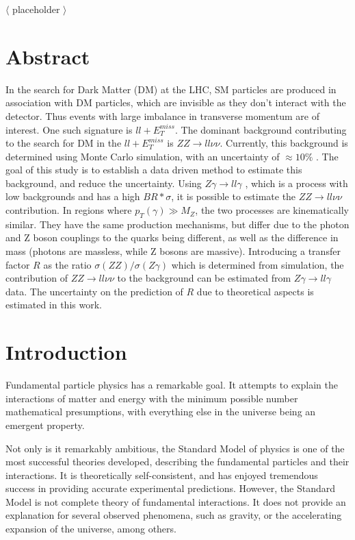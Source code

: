 \documentclass[11pt,a4paper,openright,twoside]{report}
\newcommand{\ZZ}{$ZZ\to ll\nu\nu$ }
\newcommand{\Zg}{$Z\gamma\to ll\gamma$ }
\newcommand\blankpage{%
    \null
    \thispagestyle{empty}%
    \addtocounter{page}{-1}%
    \newpage}
\begin{document}
$\langle$ placeholder $\rangle$

\newpage
\blankpage
\newpage

\chapter*{Abstract}
\setcounter{page}{1}
In the search for Dark Matter (DM) at the LHC, SM particles are produced in association with DM particles, which are invisible as they don't interact with the detector. Thus events with large imbalance in transverse momentum are of interest. One such signature is $ll + E_T^{miss}$. The dominant background contributing to the search for DM in the $ll + E_T^{miss}$ is $ZZ \rightarrow ll\nu\nu$.  Currently, this background is determined using Monte Carlo simulation, with an uncertainty of $\approx 10\%$ \cite{ZH_ATLAS}. The goal of this study is to establish a data driven method to estimate this background, and reduce the uncertainty. Using \Zg, which is a process with low backgrounds and has a high $BR*\sigma$, it is possible to estimate the \ZZ contribution. In regions where $p_{T}(\gamma) \gg M_{Z}$, the two processes are kinematically similar. They have the same production mechanisms, but differ due to the photon and Z boson couplings to the quarks being different, as well as the difference in mass (photons are massless, while Z bosons are massive). Introducing a transfer factor $R$ as the ratio $\sigma(ZZ)/\sigma(Z\gamma)$ which is determined from simulation, the contribution of \ZZ to the background can be estimated from \Zg data. The uncertainty on the prediction of $R$ due to theoretical aspects is estimated in this work.
\thispagestyle{plain}
\tableofcontents
\thispagestyle{empty}
\cleardoublepage
{}
\chapter{Introduction}
\pagestyle{plain}
\setcounter{page}{1}
Fundamental particle physics has a remarkable goal. It attempts to explain the interactions of matter and energy with the minimum possible number mathematical presumptions, with everything else in the universe being an emergent property.

Not only is it remarkably ambitious, the Standard Model of physics is one of the most successful theories developed, describing the fundamental particles and their interactions\cite{griff}. It is theoretically self-consistent, and has enjoyed tremendous success in providing accurate experimental predictions. However, the Standard Model is not complete theory of fundamental interactions. It does not provide an explanation for several observed phenomena, such as gravity, or the accelerating expansion of the universe, among others.
\end{document}
